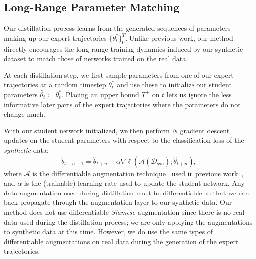 \documentclass[main.tex]{subfiles}
\begin{document}

\subsection{Long-Range Parameter Matching}
Our distillation process learns from the generated sequences of parameters making up our expert trajectories $\{\theta^*_t\}_0^T$. Unlike previous work, our method directly encourages the long-range training dynamics induced by our synthetic dataset to match those of networks trained on the real data.

At each distillation step, we first sample parameters from one of our expert trajectories at a random timestep $\theta^*_t$ and use these to initialize our student parameters $\hat{\theta}_t \coloneqq \theta^*_t$. Placing an upper bound $T^+$ on $t$ lets us ignore the less informative later parts of the expert trajectories where the parameters do not change much.

With our student network initialized, we then perform $N$ gradient descent updates on the student parameters with respect to the classification loss of the \emph{synthetic} data:
\begin{equation}
    \hat{\theta}_{t+n+1} = \hat{\theta}_{t+n} - \alpha \nabla \ell(\mathcal{A}(\mathcal{D}_\mathsf{syn}); \hat{\theta}_{t+n}),
\end{equation}
where $\mathcal{A}$ is the differentiable augmentation technique~\cite{stylegan2ada,zhao2020image,tran2020towards,diffaug} used in previous work~\cite{dsa}, and $\alpha$ is the (trainable) learning rate used to update the student network. Any data augmentation used during distillation must be differentiable so that we can back-propagate through the augmentation layer to our synthetic data. Our method does not use differentiable \textit{Siamese} augmentation since there is no real data used during the distillation process; we are only applying the augmentations to synthetic data at this time. However, we do use the same types of differentiable augmentations on real data during the generation of the expert trajectories.
\end{document}
